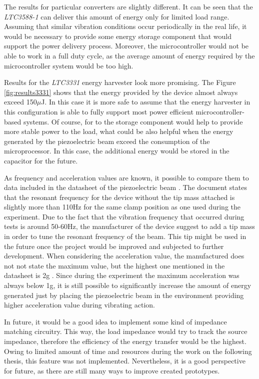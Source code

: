 \documentclass[12pt,a4paper]{article}
\begin{document}
The results for particular converters are slightly different. It can be seen that the \textit{LTC3588-1} can deliver this amount of energy only for limited load range. Assuming that similar vibration conditions occur periodically in the real life, it would be necessary to provide some energy storage component that would support the power delivery process. Moreover, the microcontroller would not be able to work in a full duty cycle, as the average amount of energy required by the microcontroller system would be too high.
\par
Results for the \textit{LTC3331} energy harvester look more promising. The Figure \ref{fig:results3331} shows that the energy provided by the device almost always exceed 150$\mu$J. In this case it is more safe to assume that the energy harvester in this configuration is able to fully support most power efficient microcontroller-based systems. Of course, for to the storage component would help to provide more stable power to the load, what could be also helpful when the energy generated by the piezoelectric beam exceed the consumption of the microprocessor. In this case, the additional energy would be stored in the capacitor for the future.
\par
As frequency and acceleration values are known, it possible to compare them to data included in the datasheet of the piezoelectric beam \cite{PPA}. The document states that the resonant frequency for the device without the tip mass attached is slightly more than 110Hz for the same clamp position as one used during the experiment. Due to the fact that the vibration frequency that occurred during tests is around 50-60Hz, the manufacturer of the device suggest to add a tip mass in order to tune the resonant frequency of the beam. This tip might be used in the future once the project would be improved and subjected to further development. When considering the acceleration value, the manufactured does not not state the maximum value, but the highest one mentioned in the datasheet is 2g \cite{PPA}. Since during the experiment the maximum acceleration was always below 1g, it is still possible to significantly increase the amount of energy generated just by placing the piezoelectric beam in the environment providing higher acceleration value during vibrating action.
\par

In future, it would be a good idea to implement some kind of impedance matching circuitry. This way, the load impedance would try to track the source impedance, therefore the efficiency of the energy transfer would be the highest. Owing to limited amount of time and resources during the work on the following thesis, this feature was not implemented. Nevertheless, it is a good perspective for future, as there are still many ways to improve created prototypes.
\par
\end{document}
